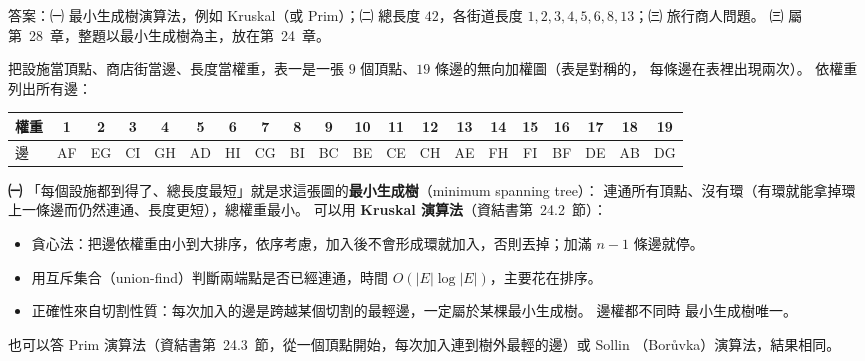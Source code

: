 \begin{pastsoln}
答案：㈠ 最小生成樹演算法，例如 Kruskal（或 Prim）；㈡ 總長度 $42$，各街道長度
$1, 2, 3, 4, 5, 6, 8, 13$；㈢ 旅行商人問題。 ㈢ 屬第~28~章，整題以最小生成樹為主，放在第~24~章。

把設施當頂點、商店街當邊、長度當權重，表一是一張 $9$ 個頂點、$19$ 條邊的無向加權圖（表是對稱的，
每條邊在表裡出現兩次）。 依權重列出所有邊：
\begin{center}
\small
\setlength{\tabcolsep}{3.5pt}
\begin{tabular}{l*{19}{c}}
\toprule
權重 & 1 & 2 & 3 & 4 & 5 & 6 & 7 & 8 & 9 & 10 & 11 & 12 & 13 & 14 & 15 & 16 & 17 & 18 & 19 \\
\midrule
邊 & AF & EG & CI & GH & AD & HI & CG & BI & BC & BE & CE & CH & AE & FH & FI & BF & DE & AB & DG \\
\bottomrule
\end{tabular}
\end{center}

\textbf{㈠} 「每個設施都到得了、總長度最短」就是求這張圖的\textbf{最小生成樹}（minimum spanning tree）：
連通所有頂點、沒有環（有環就能拿掉環上一條邊而仍然連通、長度更短），總權重最小。 可以用
\textbf{Kruskal 演算法}（資結書第~24.2~節）：
\begin{itemize}
\item 貪心法：把邊依權重由小到大排序，依序考慮，加入後不會形成環就加入，否則丟掉；加滿 $n - 1$ 條邊就停。
\item 用互斥集合（union-find）判斷兩端點是否已經連通，時間 $O(|E| \log |E|)$，主要花在排序。
\item 正確性來自切割性質：每次加入的邊是跨越某個切割的最輕邊，一定屬於某棵最小生成樹。 邊權都不同時
最小生成樹唯一。
\end{itemize}
也可以答 Prim 演算法（資結書第~24.3~節，從一個頂點開始，每次加入連到樹外最輕的邊）或 Sollin
（Bor\r{u}vka）演算法，結果相同。


\end{pastsoln}
